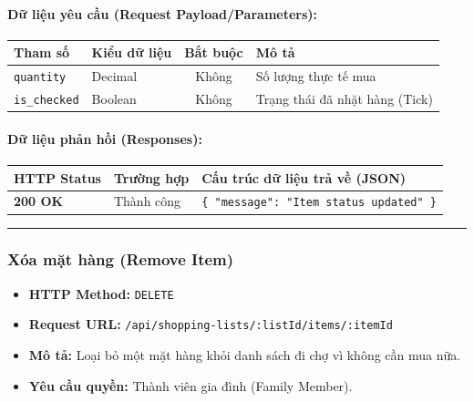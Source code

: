 \documentclass[12pt,a4paper]{article}
\begin{document}
\paragraph{Dữ liệu yêu cầu (Request Payload/Parameters):}
\begin{longtable}{|>{\raggedright\arraybackslash}p{2.8cm}|>{\raggedright\arraybackslash}p{2.2cm}|c|>{\raggedright\arraybackslash}p{7.0cm}|}
\hline
\textbf{Tham số} & \textbf{Kiểu dữ liệu} & \textbf{Bắt buộc} & \textbf{Mô tả} \\ \hline
\endhead
\texttt{quantity} & Decimal & Không & Số lượng thực tế mua \\ \hline
\texttt{is\_checked} & Boolean & Không & Trạng thái đã nhặt hàng (Tick) \\ \hline
\end{longtable}

\paragraph{Dữ liệu phản hồi (Responses):}
\begin{longtable}{|>{\raggedright\arraybackslash}p{2.8cm}|>{\raggedright\arraybackslash}p{3.2cm}|>{\raggedright\arraybackslash}p{8.0cm}|}
\hline
\textbf{HTTP Status} & \textbf{Trường hợp} & \textbf{Cấu trúc dữ liệu trả về (JSON)} \\ \hline
\endhead
\textbf{200 OK} & Thành công & \texttt{\{ "message": "Item status updated" \}} \\ \hline
\end{longtable}

\vskip 0.4cm
\noindent\rule{\textwidth}{0.3pt}
\vskip 0.4cm

\subsubsection{Xóa mặt hàng (Remove Item)}
\begin{itemize}[leftmargin=*]
    \item \textbf{HTTP Method:} \texttt{DELETE}
    \item \textbf{Request URL:} \texttt{/api/shopping-lists/:listId/items/:itemId}
    \item \textbf{Mô tả:} Loại bỏ một mặt hàng khỏi danh sách đi chợ vì không cần mua nữa.
    \item \textbf{Yêu cầu quyền:} Thành viên gia đình (Family Member).
\end{itemize}
\end{document}
